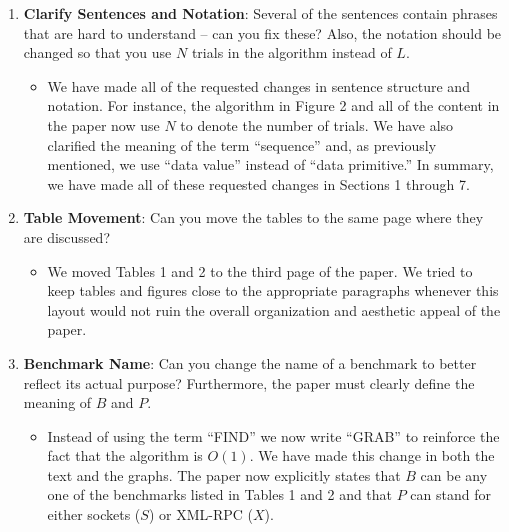 \documentclass[11pt]{article}
\begin{document}
\begin{enumerate}
\begin{itemize}
    \end{itemize}

  \item {\bf Clarify Sentences and Notation}: Several of the sentences
    contain phrases that are hard to understand -- can you fix these?
    Also, the notation should be changed so that you use $N$ trials in
    the algorithm instead of $L$.

    \begin{itemize}
      
      \item We have made all of the requested changes in sentence
        structure and notation.  For instance, the algorithm in Figure
        2 and all of the content in the paper now use $N$ to denote
        the number of trials.  We have also clarified the meaning of
        the term ``sequence'' and, as previously mentioned, we use
        ``data value'' instead of ``data primitive.''  In summary, we
        have made all of these requested changes in Sections 1 through
        7.
        
    \end{itemize}

  \item {\bf Table Movement}: Can you move the tables to the same page
    where they are discussed?

    \begin{itemize}
      
      \item We moved Tables 1 and 2 to the third page of the paper.
        We tried to keep tables and figures close to the appropriate
        paragraphs whenever this layout would not ruin the overall
        organization and aesthetic appeal of the paper.
        
    \end{itemize}

  \item {\bf Benchmark Name}: Can you change the name of a benchmark to
    better reflect its actual purpose?  Furthermore, the paper must
    clearly define the meaning of $B$ and $P$.

    \begin{itemize}
      
      \item Instead of using the term ``FIND'' we now write ``GRAB''
        to reinforce the fact that the algorithm is $O(1)$.  We have
        made this change in both the text and the graphs.  The paper
        now explicitly states that $B$ can be any one of the
        benchmarks listed in Tables 1 and 2 and that $P$ can stand for
        either sockets ($S$) or XML-RPC ($X$).
        

\end{itemize}
\end{enumerate}
\end{document}
